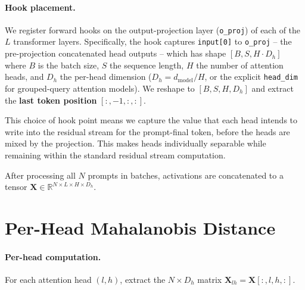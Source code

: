 \documentclass[12pt]{article}
\begin{document}
\paragraph{Hook placement.}
We register forward hooks on the output-projection layer (\texttt{o\_proj}) of each of the $L$ transformer layers. Specifically, the hook captures \texttt{input[0]} to \texttt{o\_proj} -- the pre-projection concatenated head outputs -- which has shape $[B, S, H \cdot D_h]$ where $B$ is the batch size, $S$ the sequence length, $H$ the number of attention heads, and $D_h$ the per-head dimension ($D_h = d_\text{model}/H$, or the explicit \texttt{head\_dim} for grouped-query attention models). We reshape to $[B, S, H, D_h]$ and extract the \textbf{last token position} $[:, -1, :, :]$.

This choice of hook point means we capture the value that each head intends to write into the residual stream for the prompt-final token, before the heads are mixed by the projection. This makes heads individually separable while remaining within the standard residual stream computation.

After processing all $N$ prompts in batches, activations are concatenated to a tensor $\mathbf{X} \in \mathbb{R}^{N \times L \times H \times D_h}$.

\section{Per-Head Mahalanobis Distance}
\label{sec:mahal}

\paragraph{Per-head computation.}
For each attention head $(l, h)$, extract the $N \times D_h$ matrix $\mathbf{X}_{lh} = \mathbf{X}[:, l, h, :]$.
\end{document}
